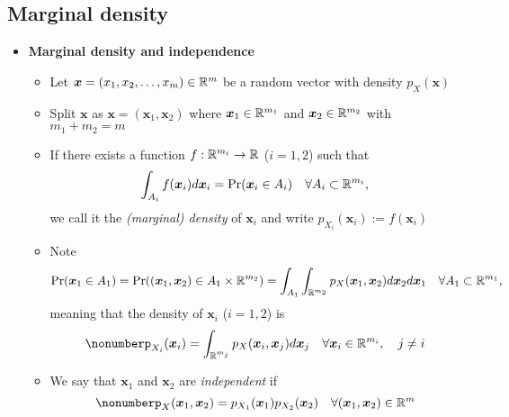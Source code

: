 \documentclass[12pt,a4paper]{article}
\begin{document}
\subsection{Marginal density}

\begin{itemize}

\item \textbf{Marginal density and independence}
  \begin{itemize}
  \item Let $\bm{x} = (x_{1},x_{2},\ldots, x_{m})\in \mathbb{R}^{m}$ be a random vector
    with density $p_{X}(\bm{x})$
  \item Split $\bm{x}$ as $\bm{x}=(\bm{x}_{1},\bm{x}_{2})$
    where $\bm{x}_{1}\in \mathbb{R}^{m_{1}}$ and $\bm{x}_{2}\in \mathbb{R}^{m_{2}}$ with $m_{1}+m_{2}=m$
  \item If there exists a function $f:\mathbb{R}^{m_{i}}\to \mathbb{R}$ ($i=1,2$) such that
    \begin{equation}\nonumber%
      \int_{A_{i}}f(\bm{x}_{i})d\bm{x}_{i}
      =
      \text{Pr}(\bm{x}_{i}\in A_{i})
      \quad \forall A_{i}\subset \R^{m_{i}},
    \end{equation}
    we call it the \emph{(marginal) density} of $\bm{x}_{i}$
    and write $p_{X_{i}}(\bm{x}_{i}):=f(\bm{x}_{i})$
  \item Note
    \begin{equation}\nonumber%
      \text{Pr}(\bm{x}_{1}\in A_{1})
      =
      \text{Pr}((\bm{x}_{1},\bm{x}_{2})\in A_{1}\times \R^{m_{2}})
      = \int_{A_{1}}\int_{\R^{m_{2}}}p_{X}(\bm{x}_{1},\bm{x}_{2})d\bm{x}_{2}d\bm{x}_{1}
      \quad \forall A_{1}\subset \R^{m_{1}},
    \end{equation}
    meaning that
    the density of $\bm{x}_{i}$ ($i=1,2$) is
    \begin{equation}\nonumber%
      p_{X_{i}}(\bm{x}_{i}) = \int_{\R^{m_{j}}}p_{X}(\bm{x}_{i},\bm{x}_{j})d\bm{x}_{j} \quad \forall \bm{x}_{i}\in \R^{m_{i}},
      \quad j\neq i
    \end{equation}
  \item We say that $\bm{x}_{1}$ and $\bm{x}_{2}$ are \emph{independent} if
    \begin{equation}\nonumber%
      p_{X}(\bm{x}_{1},\bm{x}_{2}) =
      p_{X_{1}}(\bm{x}_{1})p_{X_{2}}(\bm{x}_{2})
      \quad \forall (\bm{x}_{1},\bm{x}_{2})\in \R^{m}
    \end{equation}
  \end{itemize}


\end{itemize}
\end{document}
